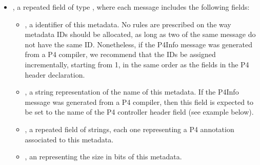 \documentclass[11pt]{article}
\begin{document}
{\begin{itemize}
\item{}
, a repeated field of type , where each  message
includes the following fields:%

\begin{itemize}[noitemsep,topsep=\mdcompacttopsep]%

\item{}, a  identifier of this metadata. No rules are prescribed on
the way metadata IDs should be allocated, as long as two  of the
same  message do not have the same
ID. Nonetheless, if the P4Info message was generated from a P4 compiler,
we recommend that the IDs be assigned incrementally, starting from 1, in
the same order as the fields in the P4 header declaration.%

\item{}, a string representation of the name of this metadata. If the
P4Info message was generated from a P4 compiler, then this field is
expected to be set to the name of the P4 controller header field (see
example below).%

\item{}, a repeated field of strings, each one representing a P4
annotation associated to this metadata.%

\item{}, an  representing the size in bits of this metadata.%


\end{itemize}
\end{itemize}}
\end{document}
